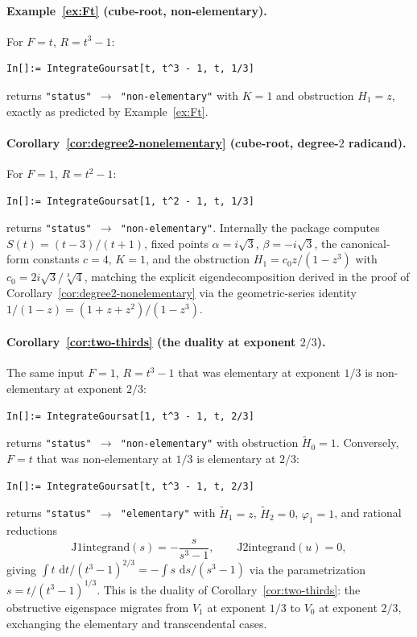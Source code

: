 \documentclass[11pt,a4paper]{article}
\theoremstyle{plain}
\theoremstyle{definition}
\theoremstyle{remark}
\renewcommand{\d}{\,\mathrm{d}}
\begin{document}
\paragraph{Example~\ref{ex:Ft} (cube-root, non-elementary).} For $F=t$, $R=t^3-1$:
\begin{lstlisting}[basicstyle=\footnotesize\ttfamily,frame=none]
In[]:= IntegrateGoursat[t, t^3 - 1, t, 1/3]
\end{lstlisting}
returns \texttt{"status"\,$\to$\,"non-elementary"} with $K=1$ and obstruction $H_1 = z$, exactly as predicted by Example~\ref{ex:Ft}.

\paragraph{Corollary~\ref{cor:degree2-nonelementary} (cube-root, degree-$2$ radicand).} For $F=1$, $R=t^2-1$:
\begin{lstlisting}[basicstyle=\footnotesize\ttfamily,frame=none]
In[]:= IntegrateGoursat[1, t^2 - 1, t, 1/3]
\end{lstlisting}
returns \texttt{"status"\,$\to$\,"non-elementary"}. Internally the package computes $S(t)=(t-3)/(t+1)$, fixed points $\alpha=i\sqrt{3}$, $\beta=-i\sqrt{3}$, the canonical-form constants $c=4$, $K=1$, and the obstruction $H_1 = c_0 z/(1-z^3)$ with $c_0 = 2i\sqrt{3}/\sqrt[3]{4}$, matching the explicit eigendecomposition derived in the proof of Corollary~\ref{cor:degree2-nonelementary} via the geometric-series identity $1/(1-z) = (1+z+z^2)/(1-z^3)$.

\paragraph{Corollary~\ref{cor:two-thirds} (the duality at exponent $2/3$).} The same input $F=1$, $R=t^3-1$ that was elementary at exponent $1/3$ is non-elementary at exponent $2/3$:
\begin{lstlisting}[basicstyle=\footnotesize\ttfamily,frame=none]
In[]:= IntegrateGoursat[1, t^3 - 1, t, 2/3]
\end{lstlisting}
returns \texttt{"status"\,$\to$\,"non-elementary"} with obstruction $\widetilde H_0 = 1$. Conversely, $F=t$ that was non-elementary at $1/3$ is elementary at $2/3$:
\begin{lstlisting}[basicstyle=\footnotesize\ttfamily,frame=none]
In[]:= IntegrateGoursat[t, t^3 - 1, t, 2/3]
\end{lstlisting}
returns \texttt{"status"\,$\to$\,"elementary"} with $\widetilde H_1 = z$, $\widetilde H_2 = 0$, $\varphi_1 = 1$, and rational reductions
\[
  \text{J1integrand}(s) = -\frac{s}{s^3-1},\qquad \text{J2integrand}(u) = 0,
\]
giving $\int t\,\d t/(t^3-1)^{2/3} = -\int s\,\d s/(s^3-1)$ via the parametrization $s = t/(t^3-1)^{1/3}$. This is the duality of Corollary~\ref{cor:two-thirds}: the obstructive eigenspace migrates from $V_1$ at exponent $1/3$ to $V_0$ at exponent $2/3$, exchanging the elementary and transcendental cases.
\end{document}
